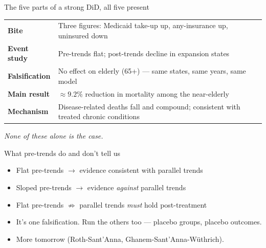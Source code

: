 \documentclass[aspectratio=169,11pt]{beamer}
\begin{document}
\begin{frame}{The five parts of a strong DiD, all five present}
\vspace{0.4em}
\begin{center}
\renewcommand{\arraystretch}{1.45}
\footnotesize
\begin{tabular}{@{}p{} p{}@{}}
\toprule
\textbf{Bite} & Three figures: Medicaid take-up up, any-insurance up, uninsured down \\
\textbf{Event study} & Pre-trends flat; post-trends decline in expansion states \\
\textbf{Falsification} & No effect on elderly (65+) --- same states, same years, same model \\
\textbf{Main result} & $\approx 9.2\%$ reduction in mortality among the near-elderly \\
\textbf{Mechanism} & Disease-related deaths fall and compound; consistent with treated chronic conditions \\
\bottomrule
\end{tabular}
\end{center}
\vspace{0.6em}
\begin{center}
\small\color{warmgray}\itshape
None of these alone is the case. 
\end{center}
\end{frame}

\begin{frame}{What pre-trends do and don't tell us}
\vspace{0.4em}
\begin{itemize}
  \item Flat pre-trends $\rightarrow$ evidence consistent with parallel trends
  \item Sloped pre-trends $\rightarrow$ evidence \textit{against} parallel trends
  \item Flat pre-trends $\nRightarrow$ parallel trends \textit{must} hold post-treatment
  \item It's one falsification. Run the others too --- placebo groups, placebo outcomes.
  \item {} More tomorrow (Roth-Sant'Anna, Ghanem-Sant'Anna-Wüthrich).
\end{itemize}
\end{frame}
\end{document}
